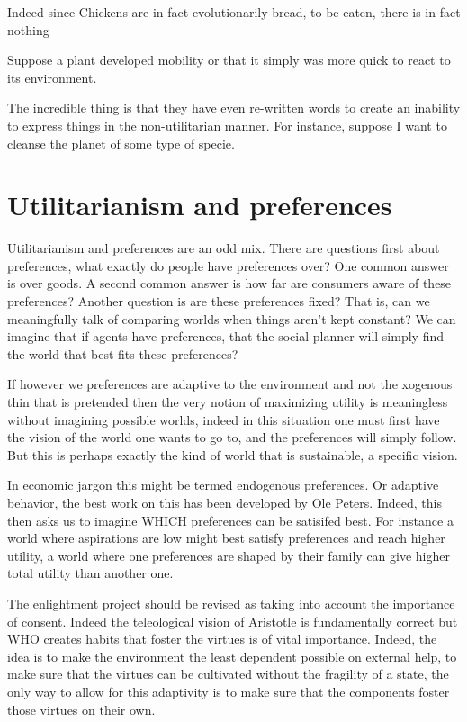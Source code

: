 \documentclass[12pt]{report}
\numberwithin{equation}{section}
\begin{document}
Indeed since Chickens are in fact evolutionarily bread, to be eaten, there is in fact nothing 

Suppose a plant developed mobility or that it simply was more quick to react to its environment. 

The incredible thing is that they have even re-written words to create an inability to express things in the non-utilitarian manner. For instance, suppose I want to cleanse the planet of some type of specie. 


\section{Utilitarianism and preferences}

Utilitarianism and preferences are an odd mix. There are questions first about preferences, what exactly do people have preferences over? One common answer is over goods. A second common answer is how far are consumers aware of these preferences? Another question is are these preferences fixed? That is, can we meaningfully talk of comparing worlds when things aren't kept constant? We can imagine that if agents have preferences, that the social planner will simply find the world that best fits these preferences? 

If however we preferences are adaptive to the environment and not the xogenous thin that is pretended then the very notion of maximizing utility is meaningless without imagining possible worlds, indeed in this situation one must first have the vision of the world one wants to go to, and the preferences will simply follow. But this is perhaps exactly the kind of world that is sustainable, a specific vision. 

In economic jargon this might be termed endogenous preferences. Or adaptive behavior, the best work on this has been developed by Ole Peters. Indeed, this then asks us to imagine WHICH preferences can be satisifed best. For instance a world where aspirations are low might best satisfy preferences and reach higher utility, a world where one preferences are shaped by their family can give higher total utility than another one. 

The enlightment project should be revised as taking into account the importance of consent. Indeed the teleological vision of Aristotle is fundamentally correct but WHO creates habits that foster the virtues is of vital importance. Indeed, the idea is to make the environment the least dependent possible on external help, to make sure that the virtues can be cultivated without the fragility of a state, the only way to allow for this adaptivity is to make sure that the components foster those virtues on their own. 
\end{document}
